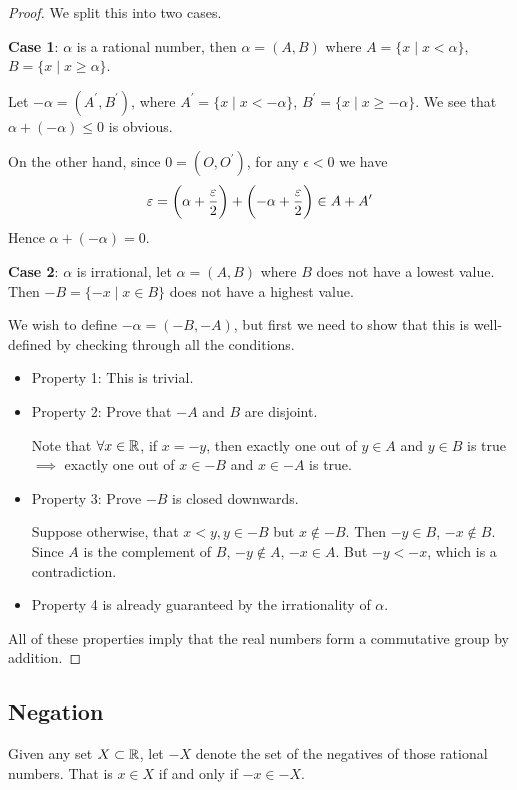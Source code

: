 \begin{proof}
We split this into two cases.

\textbf{Case 1}: $\alpha$ is a rational number, then $\alpha=(A,B)$ where $A = \{x \mid x < \alpha\}$, $B = \{x \mid x \ge \alpha\}$.

Let $-\alpha=(A^\prime,B^\prime)$, where $A^\prime = \{x \mid x < -\alpha\}$, $B^\prime = \{x \mid x\ge -\alpha\}$. 
We see that $\alpha+(-\alpha) \le 0$ is obvious.

On the other hand, since $0=(O,O^\prime)$, for any $\epsilon<0$ we have
\[ \varepsilon = \left(\alpha+\frac{\varepsilon}{2}\right) + \left(-\alpha+\frac{\varepsilon}{2}\right) \in A+A^\prime \]
Hence $\alpha+(-\alpha)=0$.

\vspace{1cm}

\textbf{Case 2}: $\alpha$ is irrational, let $\alpha = (A,B)$ where $B$ does not have a lowest value. 
Then $-B = \{-x  \mid  x \in B\}$ does not have a highest value.

We wish to define $-\alpha=(-B,-A)$, but first we need to show that this is well-defined by checking through all the conditions.

\begin{itemize}
\item Property 1: This is trivial.

\item Property 2: Prove that $- A$ and $B$ are disjoint.

Note that $\forall x \in \mathbb R$, if $x=-y$, then exactly one out of $y \in A$ and $y \in B$ is true $\implies$ exactly one out of $x \in -B$ and $x \in -A$ is true.

\item Property 3: Prove $-B$ is closed downwards.

Suppose otherwise, that $x<y, y \in -B$ but $x \notin -B$. Then $-y \in B$, $-x \notin B$. Since $A$ is the complement of $B$, $-y \notin A$, $-x \in A$. But $-y<-x$, which is a contradiction.

\item Property 4 is already guaranteed by the irrationality of $\alpha$.
\end{itemize}

All of these properties imply that the real numbers form a commutative group by addition.
\end{proof}

\subsection{Negation}
Given any set $X \subset \mathbb R$, let $-X$ denote the set of the negatives of those rational numbers. That is $x \in X$ if and only if $-x \in -X$. 

